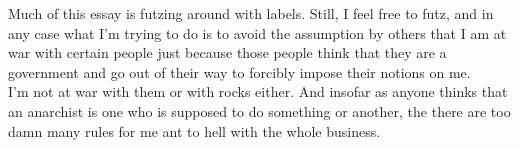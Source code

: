 Much of this essay is futzing around with labels. Still, I feel free to futz, and in any case what I'm trying to do is to avoid the assumption by others that I am at war with certain people just because those people think that they are a government and go out of their way to forcibly impose their notions on me.\\
I'm not at war with them or with rocks either. And insofar as anyone thinks that an anarchist is one who is supposed to do something or another, the there are too damn many rules for me ant to hell with the whole business.